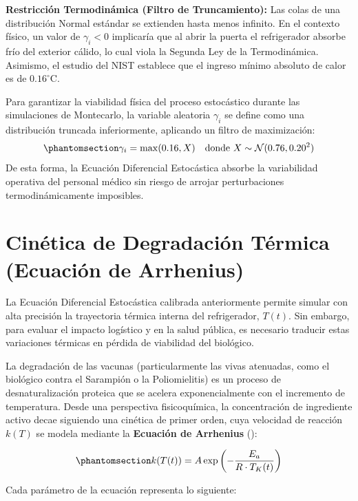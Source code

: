 \documentclass[
  spanish,
  letterpaper,
  DIV=11,
  numbers=noendperiod]{scrreprt}
\theoremstyle{plain}
\theoremstyle{plain}
\theoremstyle{plain}
\theoremstyle{definition}
\theoremstyle{remark}
\begin{document}
\textbf{Restricción Termodinámica (Filtro de Truncamiento):} Las colas
de una distribución Normal estándar se extienden hasta menos infinito.
En el contexto físico, un valor de \(\gamma_i < 0\) implicaría que al
abrir la puerta el refrigerador absorbe frío del exterior cálido, lo
cual viola la Segunda Ley de la Termodinámica. Asimismo, el estudio del
NIST establece que el ingreso mínimo absoluto de calor es de
\(0.16^\circ\text{C}\).

Para garantizar la viabilidad física del proceso estocástico durante las
simulaciones de Montecarlo, la variable aleatoria \(\gamma_i\) se define
como una distribución truncada inferiormente, aplicando un filtro de
maximización:
\begin{equation}\phantomsection\label{eq-salto-termico}{\gamma_i = \max(0.16, X) \quad \text{donde } X \sim \mathcal{N}(0.76, 0.20^2)}\end{equation}
De esta forma, la Ecuación Diferencial Estocástica absorbe la
variabilidad operativa del personal médico sin riesgo de arrojar
perturbaciones termodinámicamente imposibles.

\section{Cinética de Degradación Térmica (Ecuación de
Arrhenius)}\label{sec-Arrhenius}

La Ecuación Diferencial Estocástica calibrada anteriormente permite
simular con alta precisión la trayectoria térmica interna del
refrigerador, \(T(t)\). Sin embargo, para evaluar el impacto logístico y
en la salud pública, es necesario traducir estas variaciones térmicas en
pérdida de viabilidad del biológico.

La degradación de las vacunas (particularmente las vivas atenuadas, como
el biológico contra el Sarampión o la Poliomielitis) es un proceso de
desnaturalización proteica que se acelera exponencialmente con el
incremento de temperatura. Desde una perspectiva fisicoquímica, la
concentración de ingrediente activo decae siguiendo una cinética de
primer orden, cuya velocidad de reacción \(k(T)\) se modela mediante la
\textbf{Ecuación de Arrhenius} ():

\begin{equation}\phantomsection\label{eq-Arrhenius}{
k(T(t)) = A \exp\left(-\frac{E_a}{R \cdot T_K(t)}\right)
}\end{equation}

Cada parámetro de la ecuación representa lo siguiente:
\end{document}
